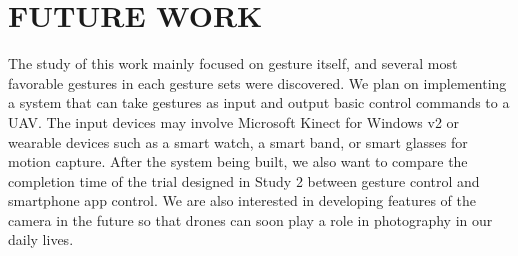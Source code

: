 \documentclass{sigchi}
\begin{document}
\section{FUTURE WORK}

The study of this work mainly focused on gesture itself, and several most favorable gestures in each gesture sets were discovered. We plan on implementing a system that can take gestures as input and output basic control commands to a UAV. The input devices may involve Microsoft Kinect for Windows v2 or wearable devices such as a smart watch, a smart band, or smart glasses for motion capture. After the system being built, we also want to compare the completion time of the trial designed in Study 2 between gesture control and smartphone app control. We are also interested in developing features of the camera in the future so that drones can soon play a role in photography in our daily lives.


%
%
%
%
%
\balance




\end{document}
